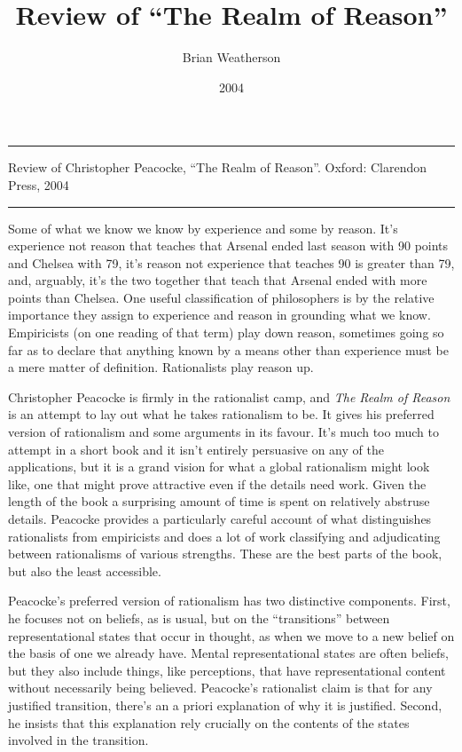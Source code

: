 \documentclass[
  10pt,
  letterpaper,
  DIV=11,
  numbers=noendperiod,
  twoside]{scrartcl}
\title{Review of ``The Realm of Reason''}
\author{Brian Weatherson}
\date{2004}
\renewenvironment{abstract}
 {\vspace{-1.25cm}
 \quotation\small\noindent\rule{\linewidth}{.5pt}\par\smallskip
 \noindent }
 {\par\noindent\rule{\linewidth}{.5pt}\endquotation}
\begin{document}
\maketitle
\begin{abstract}
Review of Christopher Peacocke, ``The Realm of Reason''. Oxford:
Clarendon Press, 2004
\end{abstract}

Some of what we know we know by experience and some by reason. It's
experience not reason that teaches that Arsenal ended last season with
90 points and Chelsea with 79, it's reason not experience that teaches
90 is greater than 79, and, arguably, it's the two together that teach
that Arsenal ended with more points than Chelsea. One useful
classification of philosophers is by the relative importance they assign
to experience and reason in grounding what we know. Empiricists (on one
reading of that term) play down reason, sometimes going so far as to
declare that anything known by a means other than experience must be a
mere matter of definition. Rationalists play reason up.

Christopher Peacocke is firmly in the rationalist camp, and \emph{The
Realm of Reason} is an attempt to lay out what he takes rationalism to
be. It gives his preferred version of rationalism and some arguments in
its favour. It's much too much to attempt in a short book and it isn't
entirely persuasive on any of the applications, but it is a grand vision
for what a global rationalism might look like, one that might prove
attractive even if the details need work. Given the length of the book a
surprising amount of time is spent on relatively abstruse details.
Peacocke provides a particularly careful account of what distinguishes
rationalists from empiricists and does a lot of work classifying and
adjudicating between rationalisms of various strengths. These are the
best parts of the book, but also the least accessible.

Peacocke's preferred version of rationalism has two distinctive
components. First, he focuses not on beliefs, as is usual, but on the
``transitions'' between representational states that occur in thought,
as when we move to a new belief on the basis of one we already have.
Mental representational states are often beliefs, but they also include
things, like perceptions, that have representational content without
necessarily being believed. Peacocke's rationalist claim is that for any
justified transition, there's an a priori explanation of why it is
justified. Second, he insists that this explanation rely crucially on
the contents of the states involved in the transition.
\end{document}
